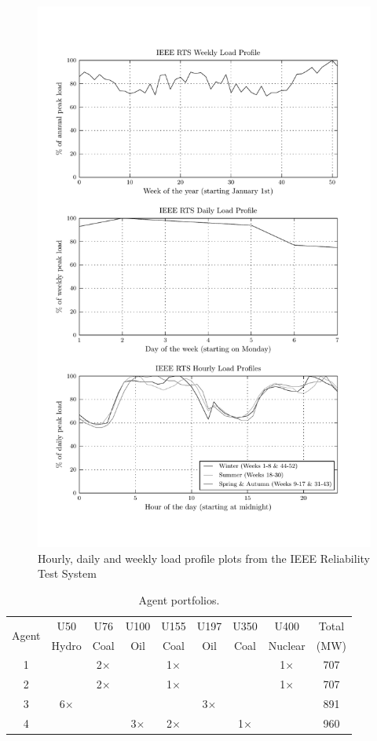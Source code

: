 {	\begin{figure}
	  \centering
	  \includegraphics{figures/ieee_rts_profiles}
	  \caption{Hourly, daily and weekly load profile plots from the IEEE
	  Reliability Test System}
	  \label{fig:ieee_rts_profiles}
	\end{figure}
}{}


\begin{table}
\centering
\begin{tabular}{c|c|c|c|c|c|c|c|c}
\hline
\multirow{2}{*}{Agent} &U50 &U76 &U100 &U155 &U197 &U350 &U400 &Total \\
 &Hydro &Coal &Oil &Coal &Oil &Coal &Nuclear &(MW) \\
\hline\hline
1 & &2$\times$ & &1$\times$ & & &1$\times$ &707 \\
2 & &2$\times$ & &1$\times$ & & &1$\times$ &707 \\
3 &6$\times$ & & & &3$\times$ & & &891 \\
4 & & &3$\times$ &2$\times$ & &1$\times$ & &960 \\
\hline
\end{tabular}
\caption{Agent portfolios.}
\label{tbl:agent_portfolios}
\end{table}

